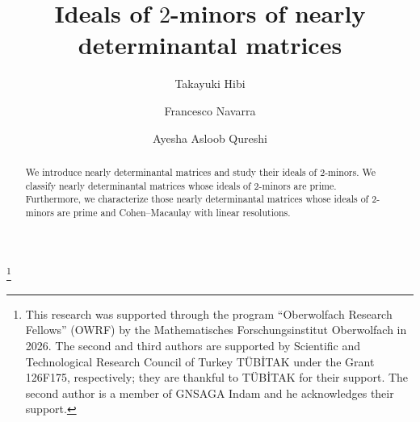 \documentclass[12pt]{amsart}
\numberwithin{equation}{section}
\begin{document}
    
        \title[Ideals of $2$-minors of nearly determinantal matrices]{Ideals of $2$-minors of nearly determinantal matrices}

\author[T.~Hibi]{Takayuki Hibi}
\address[Takayuki Hibi]
{Department of Pure and Applied Mathematics, 
Graduate School of Information Science and Technology, 
Osaka University, 
Suita, Osaka 565-0871, Japan}

\author[F. Navarra]{Francesco Navarra}      
   \address[Francesco Navarra]{Sabanci University, Faculty of Engineering and Natural Sciences, Orta Mahalle, Tuzla 34956, Istanbul, Turkey}	

 \author[A. A. Qureshi]{Ayesha Asloob Qureshi}      
    \address[Ayesha Asloob Qureshi]{Sabanci University, Faculty of Engineering and Natural Sciences, Orta Mahalle, Tuzla 34956, Istanbul, Turkey}	




        
	
    
	\thanks{This research was supported through the program “Oberwolfach Research Fellows” (OWRF) by the Mathematisches Forschungsinstitut Oberwolfach in 2026. The second and third authors are supported by Scientific and Technological Research Council of Turkey T\"UB\.{I}TAK under the Grant 126F175, respectively; they are thankful to T\"UB\.{I}TAK for their support. The second author is a member of GNSAGA Indam and he acknowledges their support.} 

        \maketitle
      


\begin{abstract}
We introduce nearly determinantal matrices and study
their ideals of $2$-minors. We classify nearly
determinantal matrices whose ideals of $2$-minors
are prime. Furthermore, we characterize those
nearly determinantal matrices whose ideals of
$2$-minors are prime and Cohen--Macaulay with
linear resolutions.
\end{abstract}
\end{document}
